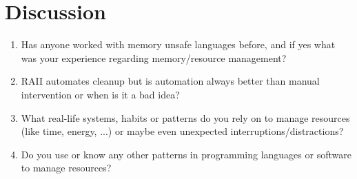 \section{Discussion}

\begin{standoutenv}
	\begin{frame}[fragile]
		\begin{enumerate}
			\item<1-> Has anyone worked with memory unsafe languages before, and if yes what was your experience regarding memory/resource management?
			\item<2-> RAII automates cleanup but is automation always better than manual intervention or when is it a bad idea?
			\item<3-> What real-life systems, habits or patterns do you rely on to manage resources (like time, energy, ...) or maybe even unexpected interruptions/distractions?
			\item<4-> Do you use or know any other patterns in programming languages or software to manage resources?
		\end{enumerate}

	\end{frame}
\end{standoutenv}
\addtocounter{framenumber}{1} %
